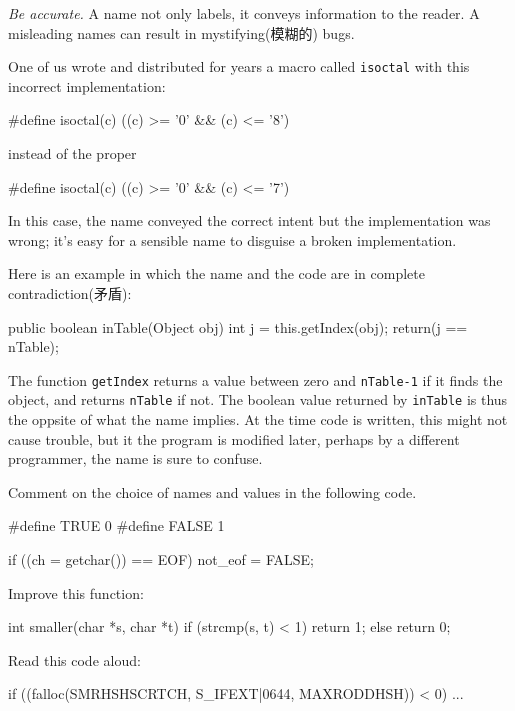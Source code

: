 \emph{Be accurate.} A name not only labels, it conveys information to the
reader. A misleading names can result in mystifying(模糊的) bugs.

One of us wrote and distributed for years a macro called \verb"isoctal"
with this incorrect implementation:
\begin{badcode}
    #define isoctal(c) ((c) >= '0' && (c) <= '8')
\end{badcode}
instead of the proper
\begin{wellcode}
    #define isoctal(c) ((c) >= '0' && (c) <= '7')
\end{wellcode}
In this case, the name conveyed the correct intent but the implementation
was wrong; it's easy for a sensible name to disguise a broken
implementation.

Here is an example in which the name and the code are in complete
contradiction(矛盾):
\begin{badcode}
    public boolean inTable(Object obj) {
        int j = this.getIndex(obj);
        return(j == nTable);
    }
\end{badcode}

The function \verb"getIndex" returns a value between zero and
\verb"nTable-1" if it finds the object, and returns \verb"nTable" if not.
The boolean value returned by \verb"inTable" is thus the oppsite of what
the name implies. At the time code is written, this might not cause
trouble, but it the program is modified later, perhaps by a different
programmer, the name is sure to confuse.

\begin{exercise}
Comment on the choice of names and values in the following code.
\begin{badcode}
    #define TRUE    0
    #define FALSE   1

    if ((ch = getchar()) == EOF)
        not_eof = FALSE;
\end{badcode}
\end{exercise}

\begin{exercise}
Improve this function:
\begin{badcode}
    int smaller(char *s, char *t) {
        if (strcmp(s, t) < 1)
            return 1;
        else 
            return 0;
    }
\end{badcode}
\end{exercise}

\begin{exercise}
Read this code aloud:
\begin{badcode}
    if ((falloc(SMRHSHSCRTCH, S_IFEXT|0644, MAXRODDHSH)) < 0)
        ...
\end{badcode}
\end{exercise}

